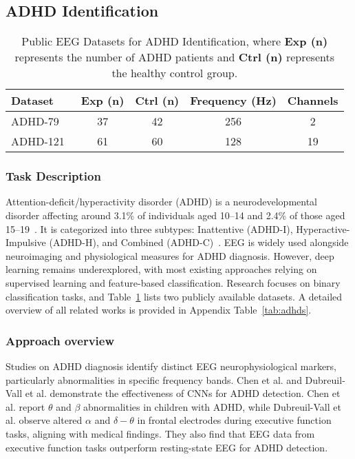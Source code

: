 \subsection{ADHD Identification}

\begin{table}[b]
\renewcommand{\arraystretch}{1}
\caption{Public EEG Datasets for ADHD Identification, where \textbf{Exp (n)} represents the number of ADHD patients and \textbf{Ctrl (n)} represents the healthy control group.}
\label{tab:adhd}
\footnotesize
\centering
\begin{tabular}{lcccc}
\hline
\textbf{Dataset}            & \textbf{Exp (n)}   & \textbf{Ctrl (n)}              & \textbf{Frequency (Hz)} & \textbf{Channels} \\
\hline
ADHD-79~\cite{sadeghibajestani2023dataset} & 37 & 42             & 256          & 2                \\
ADHD-121~\cite{rzfh-zn36-20}      & 61 & 60    & 128          & 19                \\
\hline
\end{tabular}
\end{table}
\subsubsection{Task Description}
Attention-deficit/hyperactivity disorder (ADHD) is a neurodevelopmental disorder affecting around 3.1\% of individuals aged 10–14 and 2.4\% of those aged 15–19~\cite{who_adolescent_mental_health}. 
It is categorized into three subtypes: Inattentive (ADHD-I), Hyperactive-Impulsive (ADHD-H), and Combined (ADHD-C)~\cite{nimh_adhd}.
EEG is widely used alongside neuroimaging and physiological measures for ADHD diagnosis. 
However, deep learning remains underexplored, with most existing approaches relying on supervised learning and feature-based classification. Research focuses on binary classification tasks, and Table~\ref{tab:adhd} lists two publicly available datasets.
A detailed overview of all related works is provided in Appendix Table~\ref{tab:adhds}.

\subsubsection{Approach overview}
Studies on ADHD diagnosis identify distinct EEG neurophysiological markers, particularly abnormalities in specific frequency bands. Chen et al.\cite{chen2019use} and Dubreuil-Vall et al.\cite{dubreuil2020deep} demonstrate the effectiveness of CNNs for ADHD detection.
Chen et al. report $\theta$ and $\beta$ abnormalities in children with ADHD, while Dubreuil-Vall et al. observe altered $\alpha$ and $\delta-\theta$ in frontal electrodes during executive function tasks, aligning with medical findings.
They also find that EEG data from executive function tasks outperform resting-state EEG for ADHD detection.

